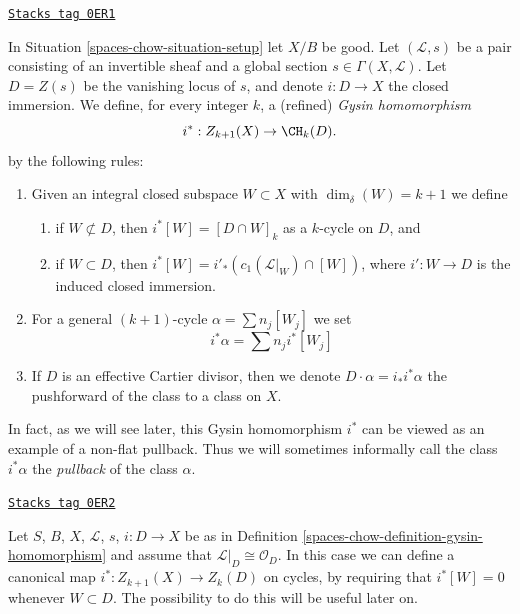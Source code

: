 \begin{definition}
\label{spaces-chow-definition-gysin-homomorphism}
\href{https://stacks.math.columbia.edu/tag/0ER1}{\texttt{Stacks tag 0ER1}}

In Situation \ref{spaces-chow-situation-setup} let $X/B$ be good.
Let $(\mathcal{L}, s)$ be a pair consisting of an invertible
sheaf and a global section $s \in \Gamma(X, \mathcal{L})$.
Let $D = Z(s)$ be the vanishing locus of $s$, and
denote $i : D \to X$ the closed immersion.
We define, for every integer $k$, a (refined) {\it Gysin homomorphism}
$$
i^* : Z_{k + 1}(X) \to \CH_k(D).
$$
by the following rules:
\begin{enumerate}
\item Given an integral closed subspace $W \subset X$ with
$\dim_\delta(W) = k + 1$ we define
\begin{enumerate}
\item if $W \not \subset D$, then $i^*[W] = [D \cap W]_k$ as a
$k$-cycle on $D$, and
\item if $W \subset D$, then
$i^*[W] = i'_*(c_1(\mathcal{L}|_W) \cap [W])$,
where $i' : W \to D$ is the induced closed immersion.
\end{enumerate}
\item For a general $(k + 1)$-cycle $\alpha = \sum n_j[W_j]$
we set
$$
i^*\alpha = \sum n_j i^*[W_j]
$$
\item If $D$ is an effective Cartier divisor, then we denote
$D \cdot \alpha = i_*i^*\alpha$ the pushforward of
the class to a class on $X$.
\end{enumerate}
\end{definition}

In fact, as we will see later, this Gysin homomorphism $i^*$ can be viewed
as an example of a non-flat pullback. Thus we will sometimes informally
call the class $i^*\alpha$ the {\it pullback} of the class $\alpha$.

\begin{remark}[On cycles]
\label{spaces-chow-remark-on-cycles}
\href{https://stacks.math.columbia.edu/tag/0ER2}{\texttt{Stacks tag 0ER2}}

Let $S$, $B$, $X$, $\mathcal{L}$, $s$, $i : D \to X$ be as in
Definition \ref{spaces-chow-definition-gysin-homomorphism} and assume
that $\mathcal{L}|_D \cong \mathcal{O}_D$. In this case we
can define a canonical map $i^* : Z_{k + 1}(X) \to Z_k(D)$
on cycles, by requiring that $i^*[W] = 0$ whenever $W \subset D$.
The possibility to do this will be useful later on.
\end{remark}

